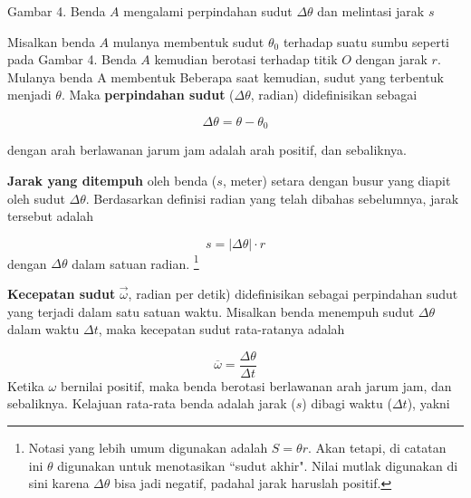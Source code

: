 \documentclass[12pt, a4paper]{article}\usepackage[utf8]{inputenc}
\theoremstyle{definition}
\theoremstyle{definition}
\begin{document}
{\centering \scriptsizer Gambar 4. Benda $A$ mengalami perpindahan sudut $\Delta \theta$ dan melintasi jarak $s$ \par}
\vspace{.5em}
\par
Misalkan benda $A$ mulanya membentuk sudut $\theta_0$ terhadap suatu sumbu seperti pada Gambar 4. Benda $A$ kemudian berotasi terhadap titik $O$ dengan jarak $r$. Mulanya benda A membentuk  Beberapa saat kemudian, sudut yang terbentuk menjadi $\theta$. Maka \textbf{perpindahan sudut} ($\Delta \theta$, radian) didefinisikan sebagai 


\vspace{-.5em}
{
\large \boldmath
\begin{equation}
	\Delta \theta = \theta - \theta_0 \tag{A.1}
\end{equation}
}

dengan arah berlawanan jarum jam adalah arah positif, dan sebaliknya.

\par
\textbf{Jarak yang ditempuh} oleh benda ($s$, meter) setara dengan busur yang diapit oleh sudut $\Delta \theta$. Berdasarkan definisi radian yang telah dibahas sebelumnya, jarak tersebut adalah

\vspace{-.5em}
{
	\large \boldmath
	\begin{equation}
		s = \left| \Delta  \theta \right| \cdot r \tag{A.2}
	\end{equation}
}
dengan $\Delta \theta$ dalam satuan radian. \footnote{Notasi yang lebih umum digunakan adalah $S = \theta r$. Akan tetapi, di catatan ini $\theta$ digunakan untuk menotasikan ``sudut akhir". Nilai mutlak digunakan di sini karena $\Delta \theta$ bisa jadi negatif, padahal jarak haruslah positif.}
\vspace{.2em}\par
\textbf{Kecepatan sudut} $\vec{\omega}$, radian per detik) didefinisikan sebagai perpindahan sudut yang terjadi dalam satu satuan waktu. Misalkan benda menempuh sudut $\Delta \theta$ dalam waktu $\Delta t$, maka kecepatan sudut rata-ratanya adalah

\vspace{-.5em}
{
	\large \boldmath
	\begin{equation}
		\overline{\omega} = \dfrac{\Delta \theta}{\Delta t} \tag{A.3}
	\end{equation}
}
Ketika $\omega$ bernilai positif, maka benda berotasi berlawanan arah jarum jam, dan sebaliknya.
Kelajuan rata-rata benda adalah jarak ($s$) dibagi waktu ($\Delta t$), yakni
\end{document}

